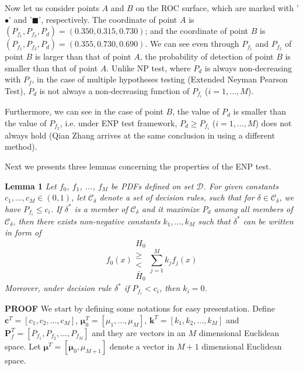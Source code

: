 Now let us consider points $A$ and $B$ on the ROC surface, which are marked with '$\bullet$' and '$\blacksquare$', respectively.  The coordinate of point $A$ is $(P_{f_1}, P_{f_2}, P_d) = (0.350, 0.315, 0.730)$; and the coordinate of point $B$ is  $(P_{f_1}, P_{f_2}, P_d) = (0.355, 0.730, 0.690)$. We can see even through $P_{f_1}$ and $P_{f_2}$ of point $B$ is larger than that of point $A$, the probability of detection of point $B$ is  smaller than that of point $A$.  
Unlike NP test, where $P_d$ is always non-decreasing with $P_f$, in the case of multiple hypotheses testing (Extended Neyman Pearson Test), $P_d$ is not always a non-decreasing function of  $P_{f_i}$ ($i=1, ..., M$).

Furthermore, we can see in the case of point $B$, the value of $P_d$ is smaller than the value of $P_{f_2}$, i.e. under ENP test framework, $P_d \geq P_{f_i}$  ($i = 1, ..., M$) does not always hold (Qian Zhang arrives at the same conclusion in  \cite{zhang1999design, zhang2000efficient} using a different method). 

Next we presents three lemmas concerning the properties of the ENP test.

\noindent \textbf{Lemma 1}
\noindent \textit{
Let $f_0$, $f_1$, ..., $f_M$ be PDFs defined on set $\mathcal{D}$. For given constants $c_1, ..., c_M \in (0, 1)$, let $\mathcal{C}_\delta$ denote a set of decision rules,  such that for $\delta \in \mathcal{C}_\delta$, we have $P_{f_i} \leq c_i$.
If  $\delta^{\ast}$ is a member of $\mathcal{C}_\delta$ and it maximize $P_d$ among all members of $\mathcal{C}_\delta$, then there exists non-negative constants $k_1, ..., k_M$ such that $\delta^\ast$ can be written in form of  
\begin{equation}
  \label{2015mar24}
f_0(x) \substack{H_0 \\ \geq \\ < \\ \bar{H}_0} \sum_{j=1}^{M}k_jf_j(x)
\end{equation}
Moreover, under decision rule $\delta^\ast$ if  $P_{f_i} < c_i$, then $k_i = 0$. 
}

\noindent\textbf{PROOF}
\newcommand{\bmu}{\boldsymbol{\mu}}
We start by defining 
 some notations for easy presentation.
Define $\mathbf{c}^T = [c_1, c_2, ..., c_M]$, $\boldsymbol{\mu}_0^T = [\mu_1, ..., \mu_M]$, $\mathbf{k}^T = [k_1, k_2, ..., k_M]$ and  $\mathbf{P}_f^T = [P_{f_1}, P_{f_2}, ..., P_{f_M}]$ and they  are vectors in an $M$ dimensional Euclidean  space. Let $\bmu^T = [\bmu_0, \mu_{M+1}]$ denote a vector in $M+1$ dimensional Euclidean space. 

